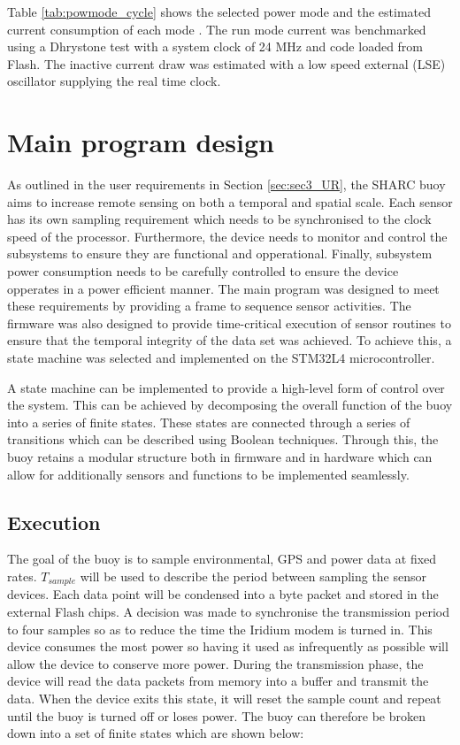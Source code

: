 Table \ref{tab:powmode_cycle} shows the selected power mode and the estimated current consumption of each mode \cite{stm32l4}. The run mode current was benchmarked using a Dhrystone test with a system clock of 24 MHz and code loaded from Flash. The inactive current draw was estimated with a low speed external (LSE) oscillator supplying the real time clock. 

\section{Main program design}
 
As outlined in the user requirements in Section \ref{sec:sec3_UR}, the SHARC buoy aims to increase remote sensing on both a temporal and spatial scale. Each sensor has its own sampling requirement which needs to be synchronised to the clock speed of the processor. Furthermore, the device needs to monitor and control the subsystems to ensure they are functional and opperational. Finally, subsystem power consumption needs to be carefully controlled to ensure the device opperates in a power efficient manner. The main program was designed to meet these requirements by providing a frame to sequence sensor activities. The firmware was also designed to provide time-critical execution of sensor routines to ensure that the temporal integrity of the data set was achieved. To achieve this, a state machine was selected and implemented on the STM32L4 microcontroller. \par

A state machine can be implemented to provide a high-level form of control over the system. This can be achieved by decomposing the overall function of the buoy into a series of finite states. These states are connected through a series of transitions which can be described using Boolean techniques. Through this, the buoy retains a modular structure both in firmware and in hardware which can allow for additionally sensors and functions to be implemented seamlessly.\par 

\subsection{Execution}

The goal of the buoy is to sample environmental, GPS and power data at fixed rates. $T_{sample}$ will be used to describe the period between sampling the sensor devices. Each data point will be condensed into a byte packet and stored in the external Flash chips. A decision was made to synchronise the transmission period to four samples so as to reduce the time the Iridium modem is turned in. This device consumes the most power so having it used as infrequently as possible will allow the device to conserve more power. During the transmission phase, the device will read the data packets from memory into a buffer and transmit the data. When the device exits this state, it will reset the sample count and repeat until the buoy is turned off or loses power. The buoy can therefore be broken down into a set of finite states which are shown below:

